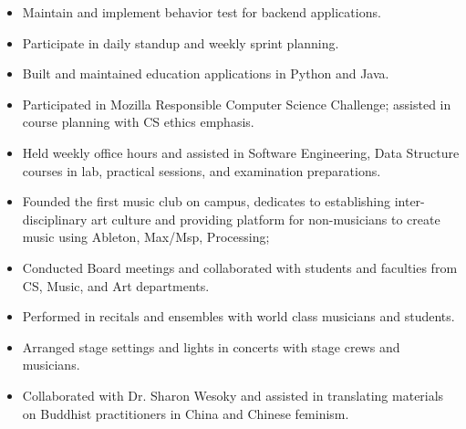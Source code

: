 \begin{itemize}
\item Maintain and implement behavior test for backend applications.
\item Participate in daily standup and weekly sprint planning.
\end{itemize}
\smallskip
{}
\begin{itemize}
\item Built and maintained education applications in Python and Java.
\item Participated in Mozilla Responsible Computer Science Challenge; assisted in course planning with CS ethics emphasis.
\item Held weekly office hours and assisted in Software Engineering, Data Structure courses in lab, practical sessions, and examination preparations.
\end{itemize}
\smallskip
{}
\begin{itemize}
\item Founded the first music club on campus, dedicates to establishing inter-disciplinary art culture and providing platform for non-musicians to create music using Ableton, Max/Msp, Processing;
\item Conducted Board meetings and collaborated with students and faculties from CS, Music, and Art departments.
\end{itemize}
\smallskip
{}
\begin{itemize}
\item Performed in recitals and ensembles with world class musicians and students.
\item Arranged stage settings and lights in concerts with stage crews and musicians.
\end{itemize}
\smallskip
{}
\begin{itemize}
\item Collaborated with Dr. Sharon Wesoky and assisted in translating materials on Buddhist practitioners in China and Chinese feminism.
\end{itemize}
\smallskip


